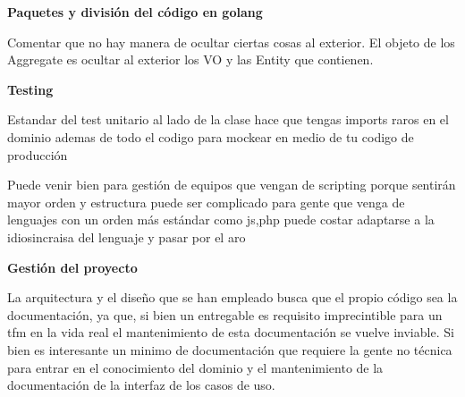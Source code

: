 \textbf{Paquetes y división del código en golang}

Comentar que no hay manera de ocultar ciertas cosas al exterior. El objeto de los Aggregate es ocultar al exterior los VO y las Entity que contienen.

\textbf{Testing}

Estandar del test unitario al lado de la clase hace que tengas imports raros en el dominio ademas de todo el codigo para mockear en medio de tu codigo de producción

Puede venir bien para gestión de equipos que vengan de scripting porque sentirán mayor orden y estructura
puede ser complicado para gente que venga de lenguajes con un orden más estándar como js,php puede costar adaptarse a la idiosincraisa del lenguaje y pasar por el aro

\textbf{Gestión del proyecto}

La arquitectura y el diseño que se han empleado busca que el propio código sea la documentación, ya que, si bien un entregable es requisito imprecintible para un tfm en la vida real el mantenimiento de esta documentación se vuelve inviable. Si bien es interesante un minimo de documentación que requiere la gente no técnica para entrar en el conocimiento del dominio y el mantenimiento de la documentación de la interfaz de los casos de uso.